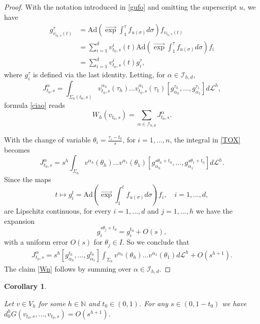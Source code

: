\documentclass[12pt, reqno]{amsart}
\theoremstyle{plain}
\newtheorem {corollary} [theorem]{Corollary}
\theoremstyle{definition}
\theoremstyle{remark}
\numberwithin{equation}{section}
\newcommand{\N}{\mathbb{N}}
\renewcommand{\L}{\mathcal{L}}
\newcommand{\I}{\mathcal{I}}
\newcommand{\s}{\sigma}
\newcommand{\0}{\theta}
\renewcommand{\a}{\alpha}
\newcommand{\1}{{-1}}
\renewcommand{\=}{\coloneqq}
\renewcommand{\.}{\dots}
\newcommand{\Ad}{\mathrm{Ad}}
\newcommand{\eexp}{\overrightarrow{\exp}}
\begin{document}
\begin{proof} With the notation introduced in \eqref{gufo} and omitting the superscript $u$, we have
 \[
 \begin{split} 
  g_{v_{t_0,s}(t)}^\tau& = \Ad\left(\eexp\int_1^\tau f_{u(\s)}d\s\right)f_{v_{t_0,s}(t)}
  \\
  &
  = \sum_{i=1}^d v_{t_0,s}^i(t)\Ad\left(\eexp\int_1^\tau f_{u(\s)}d\s\right)f_i
  \\
  &
  = \sum_{i=1}^d v_{t_0,s}^i(t)g^\tau_i,
 \end{split}
 \]
 where $g^\tau_i$ is defined via the last identity.  Letting, for  $\a\in  \I_{h,d} $,
 \begin{equation} \label{TOX}
 J_{t_0,s}^{\a  }= \int_{\Sigma_h  (t_0,s)} v_{t_0,s}
 ^{\a_h}(\tau_h)\.v_{t_0,s}^{\a_1}(\tau_1)[g^{\tau_h}_{\a_h },\dots ,g^{\tau_1}_{\a_1}] d\L^h,
 \end{equation}
 formula \eqref{ciao} reads 
 \[
  W_h(v_{t_0,s}) 
  = \sum_{\a\in \I_{h,d} } J_{t_0,s}^{\a}.
\]





 

\noindent
With  the change of variable
 $\0_i=\frac{\tau_i-t_0}{s}$, for $i=1,\.,n$, the  integral in \eqref{TOX} becomes
  \begin{equation} \label{TOX1}
 J_{t_0,s}^{\a  }= s^ h \int_{\Sigma_h } v
 ^{\a_h}(\0_h)\.v^{\a_1}(\0_1)[g^{s\0_h+t_0}_{\a_h },\dots ,g^{s\0 _1+t_0 }_{\a_1}] d\L^h.
 \end{equation}
 Since the maps
 \[
  t\mapsto g^t_i=\Ad\left(\eexp\int_1^t f_{u(\s)}d\s\right)f_i, \quad i=1,\.,d,
 \]
 are Lipschitz continuous,   for every $i=1,\.,d$  and $j=1,\.,h$ we have the expansion
 \[
  g_i^{s\0_j+t_0}=g_i^{t_0}+O(s),
 \]
with a uniform error   $O(s)$ for $\0_j\in I $. So we conclude that
 \begin{align*}
  J_{t_0,s}^{\a }   =   s^h[g_{\a_h }^{t_0}, \.,g_{\a_1}^{t_0}]\int_{\Sigma_h }v^{\a_h}(\0_h)\.v^{\a_1}(\0_1)d\L^h + O(s^{h+1}).
 \end{align*}
 The claim \eqref{Wn}  follows by summing over     $\a\in \I_{h,d}$.
 \end{proof}





\begin{corollary} \label{CORO}

Let $v\in V_h$ for some $h\in \N$  and  $ t_0\in (0,1)$. For any $s \in (0, 1-t_0)$ we have  
 $d_0^h G (v_{t_0,s},\dots,v_{t_0,s}) = O(s^{h+1})$.
\end{corollary}
\end{document}
